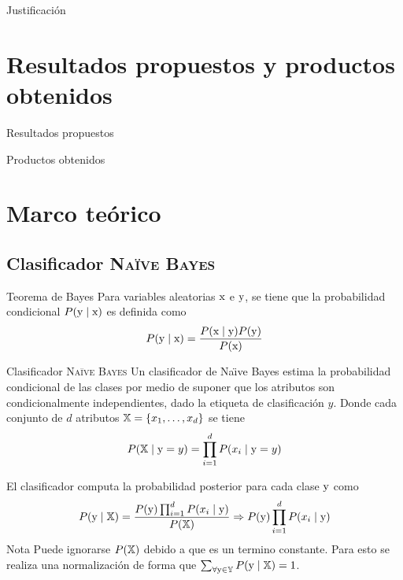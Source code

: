 \documentclass[10pt]{beamer}
\begin{document}
\begin{frame}{Justificación}
\end{frame}

\section{Resultados propuestos y productos obtenidos}

\begin{frame}{Resultados propuestos}
\end{frame}

\begin{frame}{Productos obtenidos}
\end{frame}

\section{Marco teórico}

\subsection{Clasificador \textsc{Na\"ive Bayes}}
\begin{frame}{Teorema de Bayes}
  Para variables aleatorias ${\textnormal{x}}$ e ${\textnormal{y}}$, se tiene que la probabilidad condicional $P({\textnormal{y}} \mid {\textnormal{x}})$ es definida como
  \begin{equation*}
    P({\textnormal{y}} \mid {\textnormal{x}}) = \frac{P({\textnormal{x}} \mid {\textnormal{y}}) P({\textnormal{y}})}{P({\textnormal{x}})}
  \end{equation*}
\end{frame}

\begin{frame}{Clasificador \textsc{Na\"ive Bayes}}
  Un clasificador de Na\"{\i}ve Bayes estima la probabilidad condicional de las clases por medio de suponer que los atributos son condicionalmente independientes, dado la etiqueta de clasificación $y$. Donde cada conjunto de $d$ atributos ${\mathbb{X}}=\{ x_1, \ldots, x_d \}$ se tiene
  \begin{equation*}
    P({\mathbb{X}}\mid{\textnormal{y}}=y) = \prod_{i=1}^{d} P(x_i\mid{\textnormal{y}}=y)
  \end{equation*}

  El clasificador computa la probabilidad posterior para cada clase ${\textnormal{y}}$ como
  \begin{equation*}
    P({\textnormal{y}}\mid {\mathbb{X}}) = \frac{P({\textnormal{y}}) \prod_{i=1}^{d}P(x_i\mid{\textnormal{y}})}{P({\mathbb{X}})} \Rightarrow P({\textnormal{y}}) \prod_{i=1}^{d}P(x_i\mid{\textnormal{y}})
  \end{equation*}
  \alert{Nota} Puede ignorarse $P({\mathbb{X}})$ debido a que es un termino constante. Para esto se realiza una normalización de forma que $\sum_{\forall {\textnormal{y}} \in {\mathbb{Y}}} P({\textnormal{y}}\mid {\mathbb{X}}) = 1$.
\end{frame}
\end{document}
